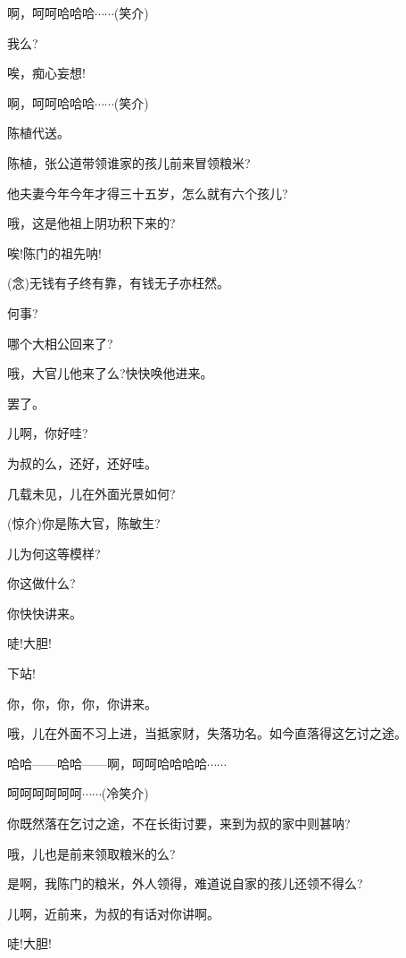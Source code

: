 {啊，呵呵哈哈哈$\cdots{}\cdots{}$({\hwfs 笑介})

我么?

唉，痴心妄想!

啊，呵呵哈哈哈$\cdots{}\cdots{}$({\hwfs 笑介})

陈植代送。

陈植，张公道带领谁家的孩儿前来冒领粮米?

他夫妻今年今年才得三十五岁，怎么就有六个孩儿?

哦，这是他祖上阴功积下来的?

唉!陈门的祖先呐!


\vspace{5pt}

({\akai 念})无钱有子终有靠，有钱无子亦枉然。

何事?

哪个大相公回来了?

哦，大官儿他来了么?快快唤他进来。

罢了。

儿啊，你好哇?

为叔的么，还好，还好哇。

几载未见，儿在外面光景如何?

({\hwfs 惊介})你是陈大官，陈敏生?

儿为何这等模样?

你这做什么?

你快快讲来。

唗!大胆!

下站!

你，你，你，你，你讲来。

哦，儿在外面不习上进，当抵家财，失落功名。如今直落得这乞讨之途。

哈哈------哈哈------啊，呵呵哈哈哈哈$\cdots{}\cdots{}$

呵呵呵呵呵呵$\cdots{}\cdots{}$({\hwfs 冷笑介})

你既然落在乞讨之途，不在长街讨要，来到为叔的家中则甚呐?

哦，儿也是前来领取粮米的么?

是啊，我陈门的粮米，外人领得，难道说自家的孩儿还领不得么?

儿啊，近前来，为叔的有话对你讲啊。

唗!大胆!

}
